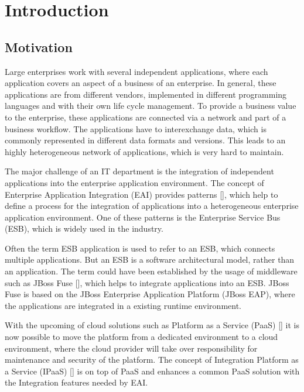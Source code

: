 \chapter{Introduction}
\label{cha:intro}

\section{Motivation}
\label{sec:intro-motivation}
Large enterprises work with several independent applications, where each application covers an aspect of a business of an enterprise. In general, these applications are from different vendors, implemented in different programming languages and with their own life cycle management. To provide a business value to the enterprise, these applications are connected via a network and part of a business workflow. The applications have to interexchange data, which is commonly represented in different data formats and versions. This leads to an highly heterogeneous network of applications, which is very hard to maintain.

The major challenge of an IT department is the integration of independent applications into the enterprise application environment. The concept of Enterprise Application Integration (EAI) provides patterns [\cite{EIP}], which help to define a process for the integration of applications into a heterogeneous enterprise application environment. One of these patterns is the Enterprise Service Bus (ESB), which is widely used in the industry.

Often the term ESB application is used to refer to an ESB, which connects multiple applications. But an ESB is a software architectural model, rather than an application. The term could have been established by the usage of middleware such as JBoss Fuse [\cite{Fuse2018}], which helps to integrate applications into an ESB. JBoss Fuse is based on the JBoss Enterprise Application Platform (JBoss EAP), where the applications are integrated in a existing runtime environment. 

With the upcoming of cloud solutions such as Platform as a Service (PaaS) [\cite[p. 2-3]{PaaS2015}] it is now possible to move the platform from a dedicated environment to a cloud environment, where the cloud provider will take over responsibility for maintenance and security of the platform. The concept of Integration Platform as a Service (IPaaS) [\cite[p. 3]{iPaaSP12015}] is on top of PaaS and enhances a common PaaS solution with the Integration features needed by EAI.
   
